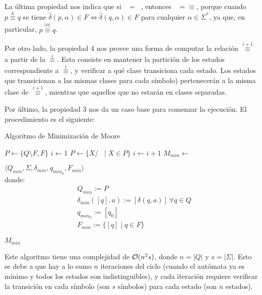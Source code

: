 La última propiedad nos indica que si $\mathop{\overset{k}{\equiv}} = \mathop{\overset{k + 1}{\equiv}}$, entonces $\mathop{\overset{k}{\equiv}} = \mathop{\equiv}$, porque cuando $p \overset{k}{\equiv} q$ se tiene $\hat\delta(p, \alpha) \in F \iff \hat\delta(q, \alpha) \in F$ para cualquier $\alpha \in \Sigma^*$, ya que, en particular, $p \overset{|\alpha|}{\equiv} q$.

Por otro lado, la propiedad 4 nos provee una forma de computar la relación $\overset{i + 1}{\equiv}$ a partir de la $\overset{i}{\equiv}$. Esta consiste en mantener la partición de los estados correspondiente a $\overset{i}{\equiv}$, y verificar a qué clase transiciona cada estado. Los estados que transicionan a las mismas clases para cada símbolo) pertenecerán a la misma clase de $\overset{i + 1}{\equiv}$, mientras que aquellos que no estarán en clases separadas.

Por último, la propiedad 3 nos da un caso base para comenzar la ejecución. El procedimiento es el siguiente:

\begin{algorithm}[H]
    \caption{Algoritmo de Minimización de Moore}
    \label{minimizacion-moore}
    \begin{algorithmic}[1]
        \State $P \gets \{Q \setminus F, F\}$
        \State $i \gets 1$
        \State $P \gets \{X / \mathop{\overset{i}{\equiv}} \mid X \in P\}$
        \State $i \gets i + 1$
        \EndWhile
        \State $M_{min} \gets $ \parbox[t]{.5\linewidth}{$\langle Q_{min}, \Sigma, \delta_{min}, q_{min_0}, F_{min} \rangle$ \vspace{3pt}\\
            \small donde:
            $$
            \begin{aligned}
                & Q_{min} := P \\
                & \delta_{min}([q], a) := [\delta(q, a)]\ \forall q \in Q \\
                & q_{min_0} := [q_0] \\
                & F_{min} := \{[q] \mid q \in F\}
            \end{aligned}
            $$}
        \State \Return $M_{min}$
        \EndProcedure
    \end{algorithmic}
\end{algorithm}

Este algoritmo tiene una complejidad de $\mathcal{O}(n^2 s)$, donde $n = |Q|$ y $s = |\Sigma|$. Esto se debe a que hay a lo sumo $n$ iteraciones del ciclo (cuando el autómata ya es mínimo y todos los estados son indistinguibles), y cada iteración requiere verificar la transición en cada símbolo (son $s$ símbolos) para cada estado (son $n$ estados).


